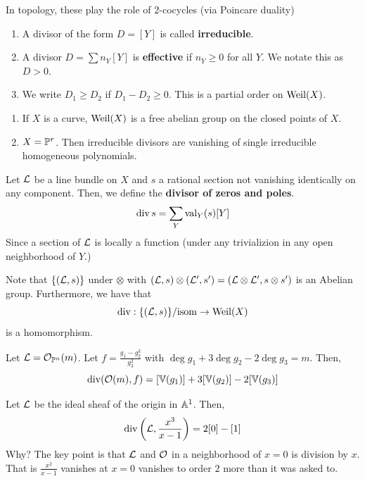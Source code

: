\documentclass[12pt]{amsart}
\begin{document}
\begin{remark}
    In topology, these play the role of $2$-cocycles (via Poincare duality)
\end{remark}

\begin{definition}
    \begin{enumerate}
        \item A divisor of the form $D = [Y]$ is called \textbf{irreducible}.
        \item A divisor $D = \sum n_Y [Y]$ is \textbf{effective} if $n_Y \geq 0$ for all $Y$. We notate this as $D > 0$. 
        \item We write $D_1 \geq D_2$ if $D_1 - D_2 \geq 0$. This is a partial order on $\Weil(X)$. 
    \end{enumerate}
\end{definition}

\begin{example}
    \begin{enumerate}
        \item If $X$ is a curve, $\Weil(X)$ is a free abelian group on the closed points of $X$. 
        \item $X = \P^r$. Then irreducible divisors are vanishing of single irreducible homogeneous polynomials. 
    \end{enumerate}
\end{example}

\begin{definition}
    Let $\LL$ be a line bundle on $X$ and $s$ a rational section not vanishing identically on any component. Then, we define the \textbf{divisor of zeros and poles}. 
    \[ \div s = \sum_Y \val_Y(s)[Y]\]
    Since a section of $\LL$ is locally a function (under any trivializion in any open neighborhood of $Y$.)
\end{definition}

Note that $\{(\LL, s)\}$ under $\otimes$ with $(\LL, s) \otimes (\LL', s') = (\LL \otimes \LL', s\otimes s')$ is an Abelian group. Furthermore, we have that
\[ \div: \{ (\LL, s)\}/\text{isom} \to \Weil(X)\]
is a homomorphism.

\begin{example}
    Let $\LL = \OO_{\P^n}(m)$. Let $f = \frac{g_1-g_2^3}{g_3^2}$ with $\deg g_1 + 3\deg g_2 - 2\deg g_3 = m$. Then, 
    \[ \div(\OO(m), f) = [\V(g_1)] + 3[\V(g_2)] - 2[\V(g_3)]\]
\end{example}

\begin{example}
    Let $\LL$ be the ideal sheaf of the origin in $\A^1$. Then, 
    \[ \div\left(\LL, \frac{x^3}{x-1}\right) = 2[0] - [1]\]
    Why? The key point is that $\LL$ and $\OO$ in a neighborhood of $x = 0$ is division by $x$. That is $\frac{x^2}{x-1}$ vanishes at $x = 0$ vanishes to order $2$ more than it was asked to. 
\end{example}
\end{document}

